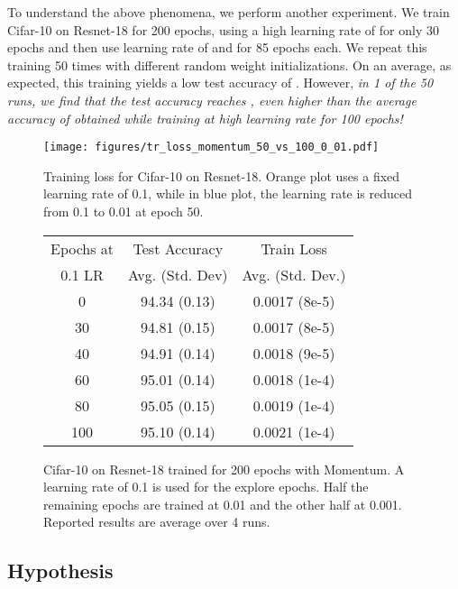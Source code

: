 \documentclass[twoside,11pt]{article}
\begin{document}
To understand the above phenomena, we perform another experiment. We train Cifar-10 on Resnet-18 for 200 epochs, using a high learning rate of  for only 30 epochs and then use learning rate of  and  for 85 epochs each. We repeat this training 50 times with different random weight initializations. On an average, as expected, this training yields a low test accuracy of . However, {\it in 1 of the 50 runs, we find that the test accuracy reaches , even higher than the average accuracy of  obtained while training at high learning rate for 100 epochs!}

\begin{figure*}[ht]
\begin{minipage}{0.45\textwidth}
  \centering
\texttt{[image: figures/tr\_loss\_momentum\_50\_vs\_100\_0\_01.pdf]}
  \caption{Training loss for Cifar-10 on Resnet-18. Orange plot uses a fixed learning rate of 0.1, while in blue plot, the learning rate is reduced from 0.1 to 0.01 at epoch 50.
}
  \label{fig:cifar-trloss-warmup50vs100}
\end{minipage}
\hfil
\begin{minipage}{0.5\textwidth}
  \centering
  \small
  \captionsetup{type=table} \caption{Cifar-10 on Resnet-18 trained for 200 epochs with Momentum. A learning rate of 0.1 is used for the explore epochs. Half the remaining epochs are trained at 0.01 and the other half at 0.001. Reported results are average over 4 runs.}
\begin{tabular}{ccc}
\toprule
Epochs at & Test Accuracy & Train Loss \\ 
0.1 LR &  Avg. (Std. Dev) &  Avg. (Std. Dev.)\\
\midrule
    0 & 94.34 (0.13) & 0.0017 (8e-5) \\
    30 & 94.81 (0.15) & 0.0017 (8e-5) \\
    40 & 94.91 (0.14) & 0.0018 (9e-5) \\
    60 & 95.01 (0.14) & 0.0018 (1e-4) \\ 
    80 & 95.05 (0.15)  & 0.0019 (1e-4) \\
    100 & 95.10 (0.14)  & 0.0021 (1e-4) \\
\bottomrule
\end{tabular}
  \label{tab:warmup_accuracy_baseline}
\end{minipage}
\end{figure*}






\subsection{Hypothesis}
\end{document}
